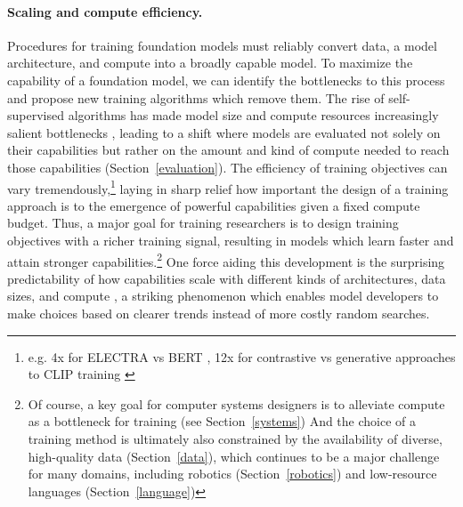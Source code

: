 \paragraph{Scaling and compute efficiency.} Procedures for training foundation models must reliably convert data, a model architecture, and compute into a broadly capable model. To maximize the capability of a foundation model, we can identify the bottlenecks to this process and propose new training algorithms which remove them. The rise of self-supervised algorithms has made model size and compute resources increasingly salient bottlenecks \citep{kaplan2020, henighan2020}, leading to a shift where models are evaluated not solely on their capabilities but rather on the amount and kind of compute needed to reach those capabilities (Section~\ref{evaluation}). The efficiency of training objectives can vary tremendously,\footnote{e.g. 4x for ELECTRA \citep{Clark2020ELECTRAPT} vs BERT \citep{devlin2019bert}, 12x for contrastive vs generative approaches to CLIP training \citep{radford2021learning}} laying in sharp relief how important the design of a training approach is to the emergence of powerful capabilities given a fixed compute budget. Thus, a major goal for training researchers is to design training objectives with a richer training signal, resulting in models which learn faster and attain stronger capabilities.\footnote{Of course, a key goal for computer systems designers is to alleviate compute as a bottleneck for training (see Section~\ref{systems}) And the choice of a training method is ultimately also constrained by the availability of diverse, high-quality data (Section~\ref{data}), which continues to be a major challenge for many domains, including robotics (Section~\ref{robotics}) and low-resource languages (Section~\ref{language})} One force aiding this development is the surprising predictability of how capabilities scale with different kinds of architectures, data sizes, and compute \citep{Hestness2017DeepLS, kaplan2020},  a striking phenomenon which enables model developers to make choices based on clearer trends instead of more costly random searches.

